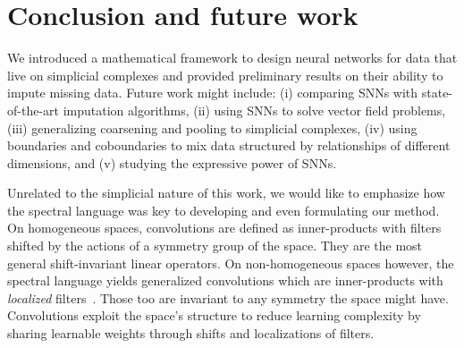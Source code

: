 \section{Conclusion and future work}

We introduced a mathematical framework to design neural networks for data that live on simplicial complexes and provided preliminary results on their ability to impute missing data.
Future work might include:
(i) comparing SNNs with state-of-the-art imputation algorithms,
(ii) using SNNs to solve vector field problems,
(iii) generalizing coarsening and pooling to simplicial complexes,
(iv) using boundaries and coboundaries to mix data structured by relationships of different dimensions,
and (v) studying the expressive power of SNNs.

Unrelated to the simplicial nature of this work, we would like to emphasize how the spectral language was key to developing and even formulating our method.
On homogeneous spaces, convolutions are defined as inner-products with filters shifted by the actions of a symmetry group of the space.
They are the most general shift-invariant linear operators.
On non-homogeneous spaces however, the spectral language yields generalized convolutions which are inner-products with \emph{localized} filters~\cite[Sec.~2.4]{perraudin2019deepsphere}. %
Those too are invariant to any symmetry the space might have.
Convolutions exploit the space's structure to reduce learning complexity by sharing learnable weights through shifts and localizations of filters.
